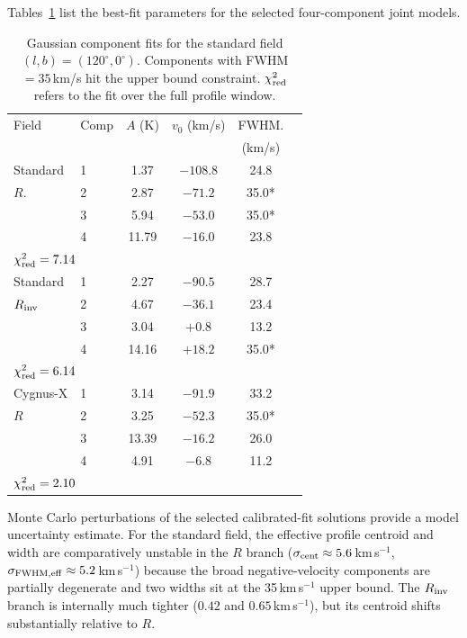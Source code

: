 \documentclass[10pt,preprint2]{aastex}
\begin{document}
Tables~\ref{tab:fits_std} list the best-fit parameters
for the selected four-component joint models.

\begin{table}[ht!]
\centering
\caption{Gaussian component fits for the standard field $(l,b) = (120^\circ, 0^\circ)$.
Components with FWHM $= 35$\,km/s hit the upper bound constraint.
$\chi^2_{\rm red}$ refers to the fit over the full profile window.}
\label{tab:fits_std}
\begin{tabular}{llcccc}
\hline\hline
Field & Comp & $A$ (K) & $v_0$ (km/s) & FWHM.  \\
      &      &         &              & (km/s) \\
\hline
Standard & 1 & 1.37  & $-108.8$ & 24.8 \\
$R$.     & 2 & 2.87  & $-71.2$  & 35.0* \\
         & 3 & 5.94  & $-53.0$  & 35.0* \\
         & 4 & 11.79 & $-16.0$  & 23.8 \\
\multicolumn{2}{l}{$\chi^2_{\rm red} = 7.14$} & & & & \\
\hline
Standard        & 1 & 2.27  & $-90.5$  & 28.7 \\
$R_{\rm inv}$   & 2 & 4.67  & $-36.1$  & 23.4 \\
                & 3 & 3.04  & $+0.8$   & 13.2 \\
                & 4 & 14.16 & $+18.2$  & 35.0* \\
\multicolumn{2}{l}{$\chi^2_{\rm red} = 6.14$} & & & & \\
\hline
Cygnus-X & 1 & 3.14  & $-91.9$ & 33.2 \\
$R$      & 2 & 3.25  & $-52.3$ & 35.0* \\
         & 3 & 13.39 & $-16.2$ & 26.0 \\
         & 4 & 4.91  & $-6.8$  & 11.2 \\
\multicolumn{2}{l}{$\chi^2_{\rm red} = 2.10$} & & & & \\
\hline\hline
\end{tabular}
\end{table}

Monte Carlo perturbations of the selected calibrated-fit solutions provide a
model uncertainty estimate. For the standard field, the effective profile centroid and
width are comparatively unstable in the $R$ branch
($\sigma_{\rm cent} \approx 5.6$\,km\,s$^{-1}$,
$\sigma_{\rm FWHM,eff} \approx 5.2$\,km\,s$^{-1}$) because the broad
negative-velocity components are partially degenerate and two widths sit at the
35\,km\,s$^{-1}$ upper bound. The $R_{\rm inv}$ branch is internally much
tighter ($0.42$ and $0.65$\,km\,s$^{-1}$), but its centroid shifts
substantially relative to $R$.
\end{document}
